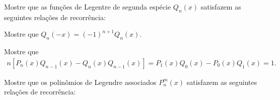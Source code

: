 \documentclass[a4paper,12pt, leqno, answers]{exam}
\begin{document}
\begin{questions}
\begin{solution}
    \end{solution}

    \question Mostre que as fun\c{c}\~{o}es de Legentre de segunda esp\'{e}cie $Q_n(x)$ satisfazem as seguintes rela\c{c}\~{o}es de recorr\^{e}ncia:

    \question Mostre que $Q_n(-x) = (-1)^{n + 1} Q_n(x)$.
    \begin{solution}
        
    \end{solution}

    \question Mostre que
    \begin{align*}
        n \left[ P_n(x) Q_{n - 1}(x) - Q_n(x) Q_{n - 1}(x) \right] = P_1(x) Q_0(x) - P_0(x) Q_1(x) = 1.
    \end{align*}
    \begin{solution}
        
    \end{solution}

    \question Mostre que os polinômios de Legendre associados $P_n^m(x)$ satisfazem as seguintes rela\c{c}\~{o}es de recorr\^{e}ncia:
\end{questions}
\end{document}
